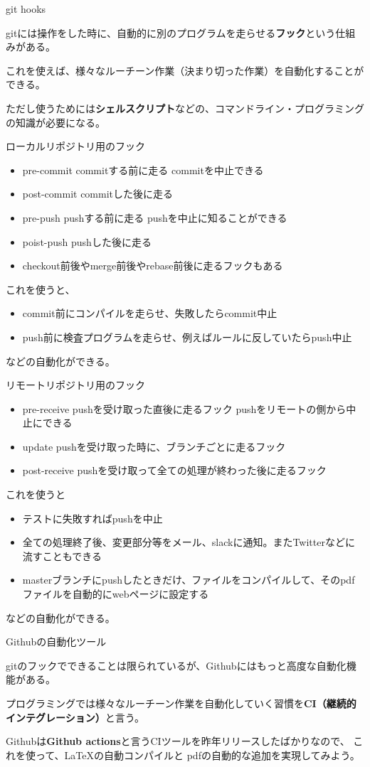 \documentclass[12pt, unicode]{beamer}
\begin{document}
\begin{frame}{git hooks}

gitには操作をした時に、自動的に別のプログラムを走らせる\textbf{フック}という仕組みがある。

これを使えば、様々なルーチーン作業（決まり切った作業）を自動化することができる。

ただし使うためには\textbf{シェルスクリプト}などの、コマンドライン・プログラミングの知識が必要になる。

\end{frame}

\begin{frame}{ローカルリポジトリ用のフック}
\begin{itemize}
\item pre-commit commitする前に走る commitを中止できる
\item post-commit commitした後に走る
\item pre-push pushする前に走る pushを中止に知ることができる
\item poist-push pushした後に走る
\item checkout前後やmerge前後やrebase前後に走るフックもある
\end{itemize}

これを使うと、

\begin{itemize}
\item commit前にコンパイルを走らせ、失敗したらcommit中止
\item push前に検査プログラムを走らせ、例えばルールに反していたらpush中止
\end{itemize}

などの自動化ができる。

\end{frame}
\begin{frame}{リモートリポジトリ用のフック}
\begin{itemize}
\item pre-receive pushを受け取った直後に走るフック pushをリモートの側から中止にできる
\item update pushを受け取った時に、ブランチごとに走るフック
\item post-receive pushを受け取って全ての処理が終わった後に走るフック
\end{itemize}

これを使うと

\begin{itemize}
\item テストに失敗すればpushを中止
\item 全ての処理終了後、変更部分等をメール、slackに通知。またTwitterなどに流すこともできる
\item masterブランチにpushしたときだけ、ファイルをコンパイルして、そのpdfファイルを自動的にwebページに設定する
\end{itemize}

などの自動化ができる。

\end{frame}
\begin{frame}{Githubの自動化ツール}

gitのフックでできることは限られているが、Githubにはもっと高度な自動化機能がある。

プログラミングでは様々なルーチーン作業を自動化していく習慣を\textbf{CI（継続的インテグレーション）}と言う。

Githubは\textbf{Github actions}と言うCIツールを昨年リリースしたばかりなので、
これを使って、\LaTeX の自動コンパイルと
pdfの自動的な追加を実現してみよう。

\end{frame}
\end{document}
